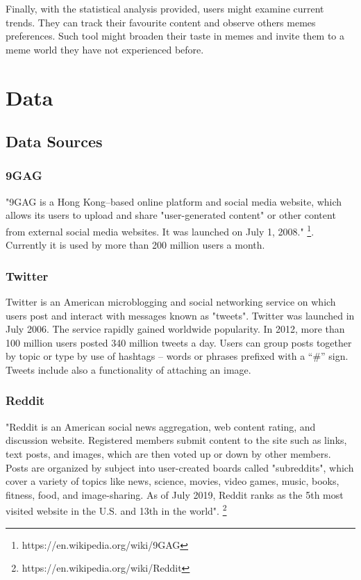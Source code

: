\documentclass{article}
\begin{document}
Finally, with the statistical analysis provided, users might examine \linebreak current trends. They can track their favourite content and observe others memes \linebreak preferences. Such tool might broaden their taste in memes and invite them to \linebreak a meme world they have not experienced before. 


\section{Data}
\subsection{Data Sources}
\subsubsection{9GAG}
"9GAG is a Hong Kong–based online platform and social media website, which allows its users to upload and share "user-generated content" or other content from external social media websites. It was launched on July 1, 2008." \footnote{https://en.wikipedia.org/wiki/9GAG}. \linebreak Currently it is used by more than 200 million users a month.


\subsubsection{Twitter}
Twitter is an American microblogging and social networking service on which users post and interact with messages known as "tweets". Twitter was launched in July 2006. The service rapidly gained worldwide popularity. In 2012, more than 100 million users posted 340 million tweets a day. Users can group posts together by topic or type by use of hashtags – words or phrases prefixed with \linebreak a “\#” sign. Tweets include also a functionality of attaching an image.

\subsubsection{Reddit}
"Reddit  is an American social news aggregation, web content rating, and \linebreak discussion website. Registered members submit content to the site such as links, text posts, and images, which are then voted up or down by other members. Posts are organized by subject into user-created boards called "subreddits", which cover a variety of topics like news, science, movies, video games, music, books, fitness, food, and image-sharing. As of July 2019, Reddit ranks as the 5th most visited website in the U.S. and 13th in the world". \footnote{https://en.wikipedia.org/wiki/Reddit}
\end{document}
